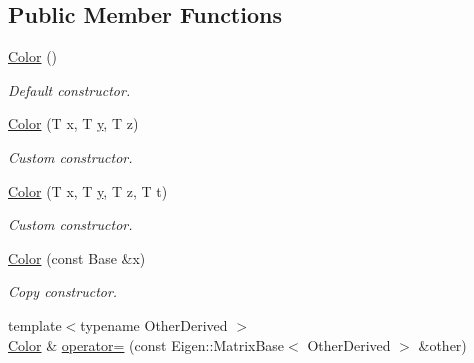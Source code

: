 \subsection*{Public Member Functions}
\begin{DoxyCompactItemize}
\item 
\hypertarget{class_d_o_1_1_color_a1589b83974b42a2f3315624f14c3c92c}{\hyperlink{class_d_o_1_1_color_a1589b83974b42a2f3315624f14c3c92c}{Color} ()}\label{class_d_o_1_1_color_a1589b83974b42a2f3315624f14c3c92c}

\begin{DoxyCompactList}\small\item\em Default constructor. \end{DoxyCompactList}\item 
\hypertarget{class_d_o_1_1_color_a86b6c08f8a3c0123d9f4df11e8ffe526}{\hyperlink{class_d_o_1_1_color_a86b6c08f8a3c0123d9f4df11e8ffe526}{Color} (T x, T \hyperlink{group___channel_accessors_gac90c52c5b3a7b2a7e3761e6e84f25778}{y}, T z)}\label{class_d_o_1_1_color_a86b6c08f8a3c0123d9f4df11e8ffe526}

\begin{DoxyCompactList}\small\item\em Custom constructor. \end{DoxyCompactList}\item 
\hypertarget{class_d_o_1_1_color_abad592080ccdd941af94bfe0150012af}{\hyperlink{class_d_o_1_1_color_abad592080ccdd941af94bfe0150012af}{Color} (T x, T \hyperlink{group___channel_accessors_gac90c52c5b3a7b2a7e3761e6e84f25778}{y}, T z, T t)}\label{class_d_o_1_1_color_abad592080ccdd941af94bfe0150012af}

\begin{DoxyCompactList}\small\item\em Custom constructor. \end{DoxyCompactList}\item 
\hypertarget{class_d_o_1_1_color_a086c48494a60de214f91d716a7510e71}{\hyperlink{class_d_o_1_1_color_a086c48494a60de214f91d716a7510e71}{Color} (const Base \&x)}\label{class_d_o_1_1_color_a086c48494a60de214f91d716a7510e71}

\begin{DoxyCompactList}\small\item\em Copy constructor. \end{DoxyCompactList}\item 
\hypertarget{class_d_o_1_1_color_acd86e5a133b3e760a79309ffff2bc996}{{\footnotesize template$<$typename Other\-Derived $>$ }\\\hyperlink{class_d_o_1_1_color}{Color} \& \hyperlink{class_d_o_1_1_color_acd86e5a133b3e760a79309ffff2bc996}{operator=} (const Eigen\-::\-Matrix\-Base$<$ Other\-Derived $>$ \&other)}\label{class_d_o_1_1_color_acd86e5a133b3e760a79309ffff2bc996}


\end{DoxyCompactItemize}
